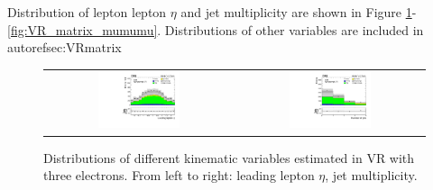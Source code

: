 Distribution of lepton lepton $\eta$ and jet multiplicity are shown in Figure \ref{fig:VR_matrix_eee}-\ref{fig:VR_matrix_mumumu}. Distributions of other variables are included in autoref{sec:VRmatrix}

\begin{figure}[tbh!]
 \begin{center}
 \begin{tabular}{cc}
 \includegraphics[width=0.45\textwidth]{figures/Part3/Nonprompt/VR/eee/lep1Eta}&
 \includegraphics[width=0.45\textwidth]{figures/Part3/Nonprompt/VR/eee/njet} \\
 \end{tabular}
 \caption{Distributions of different kinematic variables estimated in VR with three electrons. From left to right: leading lepton $\eta$, jet multiplicity.}
 \label{fig:VR_matrix_eee}
 \end{center}
\end{figure}

